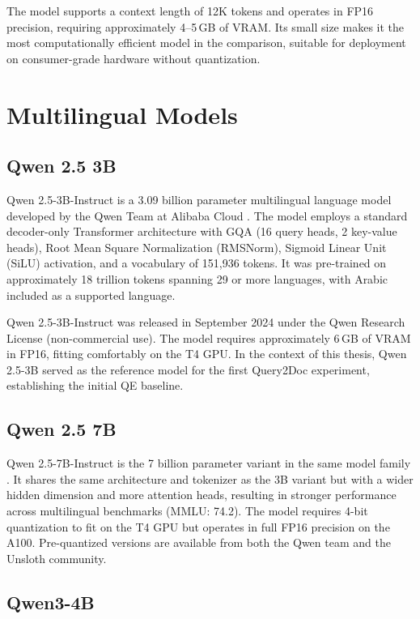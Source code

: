 The model supports a context length of 12K tokens and operates in FP16 precision, requiring approximately 4--5\,GB of VRAM. Its small size makes it the most computationally efficient model in the comparison, suitable for deployment on consumer-grade hardware without quantization.

\section{Multilingual Models}
\label{sec:multilingual_models}

\subsection{Qwen 2.5 3B}
\label{sec:qwen25_3b}

Qwen 2.5-3B-Instruct is a 3.09 billion parameter multilingual language model developed by the Qwen Team at Alibaba Cloud \cite{qwen2_5_2024}. The model employs a standard decoder-only Transformer architecture with GQA (16 query heads, 2 key-value heads), Root Mean Square Normalization (RMSNorm), Sigmoid Linear Unit (SiLU) activation, and a vocabulary of 151,936 tokens. It was pre-trained on approximately 18 trillion tokens spanning 29 or more languages, with Arabic included as a supported language.

Qwen 2.5-3B-Instruct was released in September 2024 under the Qwen Research License (non-commercial use). The model requires approximately 6\,GB of VRAM in FP16, fitting comfortably on the T4 GPU. In the context of this thesis, Qwen 2.5-3B served as the reference model for the first Query2Doc experiment, establishing the initial QE baseline.

\subsection{Qwen 2.5 7B}
\label{sec:qwen25_7b}

Qwen 2.5-7B-Instruct is the 7 billion parameter variant in the same model family \cite{qwen2_5_2024}. It shares the same architecture and tokenizer as the 3B variant but with a wider hidden dimension and more attention heads, resulting in stronger performance across multilingual benchmarks (MMLU: 74.2). The model requires 4-bit quantization to fit on the T4 GPU but operates in full FP16 precision on the A100. Pre-quantized versions are available from both the Qwen team and the Unsloth community.

\subsection{Qwen3-4B}
\label{sec:qwen3_4b}

